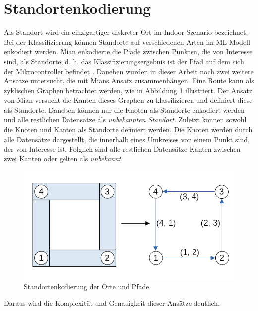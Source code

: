 \section{Standortenkodierung}
\label{sec:model_location_encoding}
Als Standort wird ein einzigartiger diskreter Ort im Indoor-Szenario bezeichnet.
Bei der Klassifizierung können Standorte auf verschiedenen Arten im ML-Modell enkodiert werden.
Mian enkodierte die Pfade zwischen Punkten, die von Interesse sind, als Standorte,
d. h. das Klassifizierungsergebnis ist der Pfad auf dem sich der Mikrocontroller befindet \cite{naveedThesis}.
\newline
\newline
Daneben wurden in dieser Arbeit noch zwei weitere Ansätze untersucht, die mit Mians Ansatz zusammenhängen.
Eine Route kann als zyklischen Graphen betrachtet werden, wie in Abbildung \ref{fig:location_encoding} illustriert.
Der Ansatz von Mian versucht die Kanten dieses Graphen zu klassifizieren und definiert diese als Standorte.
Daneben können nur die Knoten als Standorte enkodiert werden und alle restlichen Datensätze als \textit{unbekannten Standort}.
Zuletzt können sowohl die Knoten und Kanten als Standorte definiert werden.
\newline
\newline
Die Knoten werden durch alle Datensätze dargestellt, die innerhalb eines Umkreises von einem Punkt sind, der von Interesse ist.
Folglich sind alle restlichen Datensätze Kanten zwischen zwei Kanten oder gelten als \textit{unbekannt}.
\begin{figure}[h!]
    \centering
    \includegraphics[width=\linewidth]{images/location_encoding.png}
    \caption{Standortenkodierung der Orte und Pfade.}
    \label{fig:location_encoding}
\end{figure}
\newline
Daraus wird die Komplexität und Genauigkeit dieser Ansätze deutlich.
